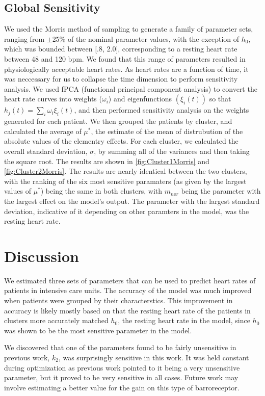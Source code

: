\documentclass[fleqn,10pt]{wlscirep}
\begin{document}
\subsection{Global Sensitivity}
We used the Morris method of sampling to generate a family of parameter sets, ranging from $\pm$25\% of the nominal parameter values, with the exception of $h_0$, which was bounded between [.8, 2.0], corresponding to a resting heart rate between 48 and 120 bpm.\cite{morris1991factorial} We found that this range of parameters resulted in physiologically acceptable heart rates. As heart rates are a function of time, it was neccessary for us to collapse the time dimension to perform sensitivity analysis. We used fPCA (functional principal component analysis) to convert the heart rate curves into weights ($\omega_i$) and eigenfunctions $(\xi_i(t))$ so that $h_j(t)=\sum_i \omega_i \xi_i(t)$, and then performed sensitivity analysis on the weights generated for each patient. \cite{sumner2012methodology} We then grouped the patients by cluster, and calculated the average of $\mu^*$, the estimate of the mean of distrubution of the absolute values of the elementry effects. For each cluster, we calculated the overall standard deviation, $\sigma$, by summing all of the variances and then taking the square root. \cite{1_normal sum distribution} The results are shown in \ref{fig:Cluster1Morris} and \ref{fig:Cluster2Morris}. The results are nearly identical between the two clusters, with the ranking of the six most sensitive paramaters (as given by the largest values of $\mu^*$) being the same in both clusters, with $m_{nor}$ being the parameter with the largest effect on the model's output. The parameter with the largest standard deviation, indicative of it depending on other paramters in the model, was the resting heart rate. 

\section*{Discussion}
We estimated three sets of parameters that can be used to predict heart rates of patients in intensive care units. The accuracy of the model was much improved when patients were grouped by their characterstics. This improvement in accuracy is likely mostly based on that the resting heart rate of the patients in clusters more accurately matched $h_0$, the resting heart rate in the model, since $h_0$ was shown to be the most sensitive parameter in the model. 

We discovered that one of the parameters found to be fairly unsensitive in previous work, $k_2$, was surprisingly sensitive in this work. It was held constant during optimization as previous work pointed to it being a very unsensitive parameter, but it proved to be very sensitive in all cases. Future work may involve estimating a better value for the gain on this type of barroreceptor. 
\end{document}
